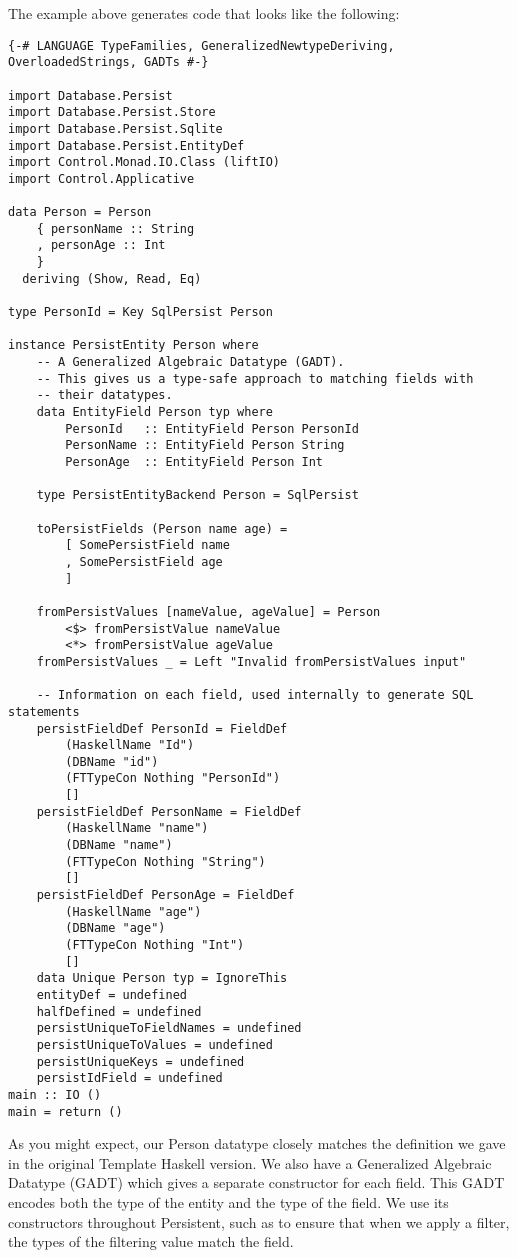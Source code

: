 The example above generates code that looks like the following:

\begin{lstlisting}
{-# LANGUAGE TypeFamilies, GeneralizedNewtypeDeriving, OverloadedStrings, GADTs #-}

import Database.Persist
import Database.Persist.Store
import Database.Persist.Sqlite
import Database.Persist.EntityDef
import Control.Monad.IO.Class (liftIO)
import Control.Applicative

data Person = Person
    { personName :: String
    , personAge :: Int
    }
  deriving (Show, Read, Eq)

type PersonId = Key SqlPersist Person

instance PersistEntity Person where
    -- A Generalized Algebraic Datatype (GADT).
    -- This gives us a type-safe approach to matching fields with
    -- their datatypes.
    data EntityField Person typ where
        PersonId   :: EntityField Person PersonId
        PersonName :: EntityField Person String
        PersonAge  :: EntityField Person Int

    type PersistEntityBackend Person = SqlPersist

    toPersistFields (Person name age) =
        [ SomePersistField name
        , SomePersistField age
        ]

    fromPersistValues [nameValue, ageValue] = Person
        <$> fromPersistValue nameValue
        <*> fromPersistValue ageValue
    fromPersistValues _ = Left "Invalid fromPersistValues input"

    -- Information on each field, used internally to generate SQL statements
    persistFieldDef PersonId = FieldDef
        (HaskellName "Id")
        (DBName "id")
        (FTTypeCon Nothing "PersonId")
        []
    persistFieldDef PersonName = FieldDef
        (HaskellName "name")
        (DBName "name")
        (FTTypeCon Nothing "String")
        []
    persistFieldDef PersonAge = FieldDef
        (HaskellName "age")
        (DBName "age")
        (FTTypeCon Nothing "Int")
        []
    data Unique Person typ = IgnoreThis
    entityDef = undefined
    halfDefined = undefined
    persistUniqueToFieldNames = undefined
    persistUniqueToValues = undefined
    persistUniqueKeys = undefined
    persistIdField = undefined
main :: IO ()
main = return ()
\end{lstlisting}

As you might expect, our Person datatype closely matches the definition we gave in the original Template Haskell version. We also have a Generalized Algebraic Datatype (GADT) which gives a separate constructor for each field. This GADT encodes both the type of the entity and the type of the field. We use its constructors throughout Persistent, such as to ensure that when we apply a filter, the types of the filtering value match the field.

